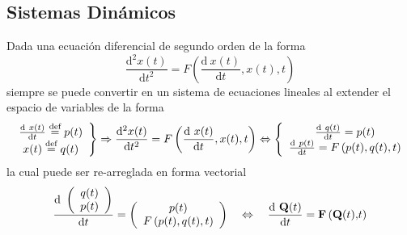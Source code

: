 \documentclass[spanish,titlepage,11pt]{article}
\begin{document}
\subsection{Sistemas Din\'{a}micos}

Dada una ecuaci\'{o}n diferencial de segundo orden de la forma
\[
\frac{\mathrm{d}^{2}x(t)}{\mathrm{d}t^{2}}=F\left(  \frac{\mathrm{d\ }%
x(t)}{\mathrm{d}t},x(t),t\right)
\]
siempre se puede convertir en un sistema de ecuaciones lineales al extender el
espacio de variables de la forma
\[
\left.
\begin{array}
[c]{c}%
\frac{\mathrm{d\ }x(t)}{\mathrm{d}t}\overset{\text{def}}{=}p(t)\\
x(t)\overset{\text{def}}{=}q(t)
\end{array}
\right\}  \Rightarrow\frac{\mathrm{d}^{2}x(t)}{\mathrm{d}t^{2}}=F\left(
\frac{\mathrm{d\ }x(t)}{\mathrm{d}t},x(t),t\right)  \Leftrightarrow\left\{
\begin{array}
[c]{c}%
\frac{\mathrm{d\ }q(t)}{\mathrm{d}t}=p(t)\\
\frac{\mathrm{d\ }p(t)}{\mathrm{d}t}=F\left(  p(t),q(t),t\right)
\end{array}
\right.
\]
la cual puede ser re-arreglada en forma vectorial
\[
\frac{\mathrm{d\ }\left(
\begin{array}
[c]{c}%
q(t)\\
p(t)
\end{array}
\right)  }{\mathrm{d}t}=\left(
\begin{array}
[c]{c}%
p(t)\\
F\left(  p(t),q(t),t\right)
\end{array}
\right)  \quad\Leftrightarrow\quad\frac{\mathrm{d\ }\mathbf{Q(}t\mathbf{)}%
}{\mathrm{d}t}=\mathbf{F}\left(  \mathbf{Q(}t\mathbf{),}t\right)
\]
\end{document}
